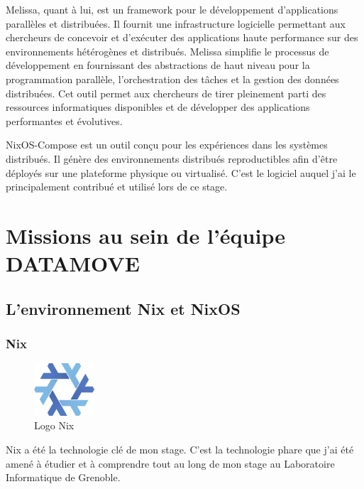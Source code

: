 \documentclass[a4paper,french,12pt, titlepage]{article}
\begin{document}
Melissa, quant à lui, est un framework pour le développement
d'applications parallèles et distribuées. Il fournit une infrastructure
logicielle permettant aux chercheurs de concevoir et d'exécuter des
applications haute performance sur des environnements hétérogènes et
distribués. Melissa simplifie le processus de développement en
fournissant des abstractions de haut niveau pour la programmation
parallèle, l'orchestration des tâches et la gestion des données
distribuées. Cet outil permet aux chercheurs de tirer pleinement parti
des ressources informatiques disponibles et de développer des
applications performantes et évolutives.\newline

NixOS-Compose est un outil conçu pour les expériences dans les systèmes
distribués. Il génère des environnements distribués reproductibles afin
d'être déployés sur une plateforme physique ou virtualisé. C'est le
logiciel auquel j'ai le principalement contribué et utilisé lors de ce
stage.

\newpage

\hypertarget{missions-au-sein-de-luxe9quipe-datamove}{%
\section{Missions au sein de l'équipe
DATAMOVE}\label{missions-au-sein-de-luxe9quipe-datamove}}

\hypertarget{lenvironnement-nix-et-nixos}{%
\subsection{L'environnement Nix et
NixOS}\label{lenvironnement-nix-et-nixos}}

\hypertarget{nix}{%
\subsubsection{Nix}\label{nix}}

\begin{figure}[h]
\centering
\includegraphics[width=0.2\textwidth,height=0.2\textheight,keepaspectratio]{logos/nixlogo.png}
\caption{Logo Nix}
\end{figure}

Nix a été la technologie clé de mon stage. C'est la technologie phare
que j'ai été amené à étudier et à comprendre tout au long de mon stage
au Laboratoire Informatique de Grenoble.\newline
\end{document}
